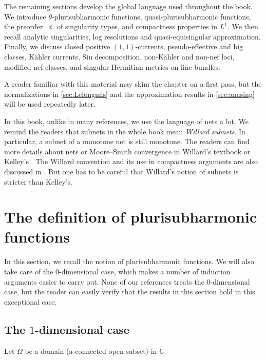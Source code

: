 The remaining sections develop the global language used throughout the book. We introduce $\theta$-plurisubharmonic functions, quasi-plurisubharmonic functions, the preorder $\preceq$ of singularity types, and compactness properties in $L^1$. We then recall analytic singularities, log resolutions and quasi-equisingular approximation. Finally, we discuss closed positive $(1,1)$-currents, pseudo-effective and big classes, K\"ahler currents, Siu decomposition, non-K\"ahler and non-nef loci, modified nef classes, and singular Hermitian metrics on line bundles.

A reader familiar with this material may skim the chapter on a first pass, but the normalizations in \cref{sec:Lelongmis} and the approximation results in \cref{sec:anasing} will be used repeatedly later.

In this book, unlike in many references, we use the language of nets a lot. We remind the readers that subnets in the whole book mean \emph{Willard subnets}. In particular, a subnet of a monotone net is still monotone. The readers can find more details about nets or Moore--Smith convergence in Willard's textbook \cite{Wil70} or Kelley's \cite{Kel75}. The Willard convention and its use in compactness arguments are also discussed in \cite[Section~1.6]{FPT}. But one has to be careful that Willard's notion of subnets is stricter than Kelley's.


\section{The definition of plurisubharmonic functions}
\label{sec:pshdef}
In this section, we recall the notion of plurisubharmonic functions. We will also take care of the $0$-dimensional case, which makes a number of induction arguments easier to carry out.
None of our references treats the $0$-dimensional case, but the reader can easily verify that the results in this section hold in this exceptional case.

\subsection{The \texorpdfstring{$1$}{1}-dimensional case}
\label{subsec:psh_1d}
Let $\Omega$ be a domain (a connected open subset) in $\mathbb{C}$.


